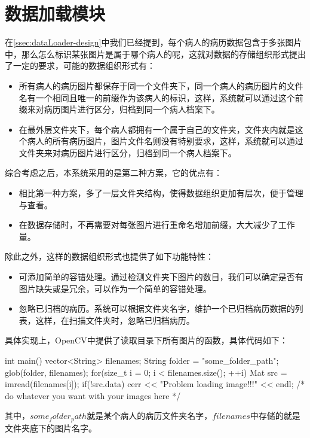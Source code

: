 \section{数据加载模块}  %
在\autoref{ssec:dataLoader-design}中我们已经提到，每个病人的病历数据包含于多张图片中，那么怎么标识某张图片是属于哪个病人的呢，这就对数据的存储组织形式提出了一定的要求，可能的数据组织形式有：
\begin{itemize}
	\item 所有病人的病历图片都保存于同一个文件夹下，同一个病人的病历图片的文件名有一个相同且唯一的前缀作为该病人的标识，这样，系统就可以通过这个前缀来对病历图片进行区分，归档到同一个病人档案下。
	\item 在最外层文件夹下，每个病人都拥有一个属于自己的文件夹，文件夹内就是这个病人的所有病历图片，图片文件名则没有特别要求，这样，系统就可以通过文件夹来对病历图片进行区分，归档到同一个病人档案下。
\end{itemize}
综合考虑之后，本系统采用的是第二种方案，它的优点有：
\begin{itemize}
	\item 相比第一种方案，多了一层文件夹结构，使得数据组织更加有层次，便于管理与查看。
	\item 在数据存储时，不再需要对每张图片进行重命名增加前缀，大大减少了工作量。
\end{itemize}
除此之外，这样的数据组织形式也提供了如下功能特性：
\begin{itemize}
	\item 可添加简单的容错处理。通过检测文件夹下图片的数目，我们可以确定是否有图片缺失或是冗余，可以作为一个简单的容错处理。
	\item 忽略已归档的病历。系统可以根据文件夹名字，维护一个已归档病历数据的列表，这样，在扫描文件夹时，忽略已归档病历。
\end{itemize}
具体实现上，OpenCV中提供了读取目录下所有图片的函数，具体代码如下：
\begin{Codex}[label=readImages,numbers=left]
	int main()
	{
	    vector<String> filenames;
	    String folder = "some_folder_path";
	    glob(folder, filenames);
	    for(size_t i = 0; i < filenames.size(); ++i)
	    {
	        Mat src = imread(filenames[i]);
	        if(!src.data)
	            cerr << "Problem loading image!!!" << endl;
	        /* do whatever you want with your images here */
	    }
	}
\end{Codex}
其中，$some_folder_path$就是某个病人的病历文件夹名字，$filenames$中存储的就是文件夹底下的图片名字。

